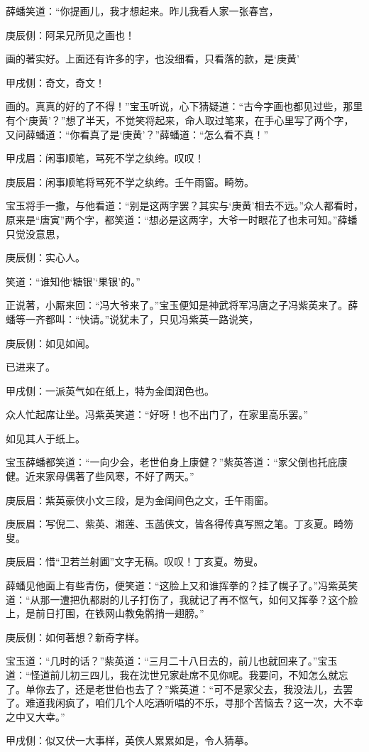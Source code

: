 \begin{parag}
    薛蟠笑道：“你提画儿，我才想起来。昨儿我看人家一张春宫，\begin{note}庚辰侧：阿呆兄所见之画也！\end{note}画的著实好。上面还有许多的字，也没细看，只看落的款，是‘庚黄’\begin{note}甲戌侧：奇文，奇文！\end{note}画的。真真的好的了不得！”宝玉听说，心下猜疑道：“古今字画也都见过些，那里有个‘庚黄’？”想了半天，不觉笑将起来，命人取过笔来，在手心里写了两个字，又问薛蟠道：“你看真了是‘庚黄’？”薛蟠道：“怎么看不真！”\begin{note}甲戌眉：闲事顺笔，骂死不学之纨绔。叹叹！\end{note}\begin{note}庚辰眉：闲事顺笔将骂死不学之纨绔。壬午雨窗。畸笏。\end{note}宝玉将手一撒，与他看道：“别是这两字罢？其实与‘庚黄’相去不远。”众人都看时，原来是“唐寅”两个字，都笑道：“想必是这两字，大爷一时眼花了也未可知。”薛蟠只觉没意思，\begin{note}庚辰侧：实心人。\end{note}笑道：“谁知他‘糖银’‘果银’的。”
\end{parag}


\begin{parag}
    正说著，小厮来回：“冯大爷来了。”宝玉便知是神武将军冯唐之子冯紫英来了。薛蟠等一齐都叫：“快请。”说犹未了，只见冯紫英一路说笑，\begin{note}庚辰侧：如见如闻。\end{note}已进来了。\begin{note}甲戌侧：一派英气如在纸上，特为金闺润色也。\end{note}众人忙起席让坐。冯紫英笑道：“好呀！也不出门了，在家里高乐罢。”\begin{note}如见其人于纸上。\end{note}宝玉薛蟠都笑道：“一向少会，老世伯身上康健？”紫英答道：“家父倒也托庇康健。近来家母偶著了些风寒，不好了两天。”\begin{note}庚辰眉：紫英豪侠小文三段，是为金闺间色之文，壬午雨窗。\end{note}\begin{note}庚辰眉：写倪二、紫英、湘莲、玉菡侠文，皆各得传真写照之笔。丁亥夏。畸笏叟。\end{note}\begin{note}庚辰眉：惜“卫若兰射圃”文字无稿。叹叹！丁亥夏。笏叟。\end{note}薛蟠见他面上有些青伤，便笑道：“这脸上又和谁挥拳的？挂了幌子了。”冯紫英笑道：“从那一遭把仇都尉的儿子打伤了，我就记了再不怄气，如何又挥拳？这个脸上，是前日打围，在铁网山教兔鹘捎一翅膀。”\begin{note}庚辰侧：如何著想？新奇字样。\end{note}宝玉道：“几时的话？”紫英道：“三月二十八日去的，前儿也就回来了。”宝玉道：“怪道前儿初三四儿，我在沈世兄家赴席不见你呢。我要问，不知怎么就忘了。单你去了，还是老世伯也去了？”紫英道：“可不是家父去，我没法儿，去罢了。难道我闲疯了，咱们几个人吃酒听唱的不乐，寻那个苦恼去？这一次，大不幸之中又大幸。”\begin{note}甲戌侧：似又伏一大事样，英侠人累累如是，令人猜摹。\end{note}
\end{parag}


